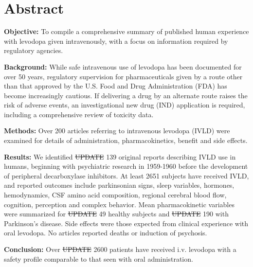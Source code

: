 \section{Abstract}
\textbf{Objective:} To compile a comprehensive summary of published human experience with levodopa given intravenously, with a focus on information required by regulatory agencies.

\textbf{Background:} While safe intravenous use of levodopa has been documented for over 50 years, regulatory supervision for pharmaceuticals given by a route other than that approved by the U.S. Food and Drug Administration (FDA) has become increasingly cautious. If delivering a drug by an alternate route raises the risk of adverse events, an investigational new drug (IND) application is required, including a comprehensive review of toxicity data.

\textbf{Methods:} Over 200 articles referring to intravenous levodopa (IVLD) were examined for details of administration, pharmacokinetics, benefit and side effects.

\textbf{Results:} We identified \sout{UPDATE} 139 original reports describing IVLD use in humans, beginning with psychiatric research in 1959-1960 before the development of peripheral decarboxylase inhibitors. At least 2651 subjects have received IVLD, and reported outcomes include parkinsonian signs, sleep variables, hormones, hemodynamics, CSF amino acid composition, regional cerebral blood ﬂow, cognition, perception and complex behavior. Mean pharmacokinetic variables were summarized for \sout{UPDATE} 49 healthy subjects and \sout{UPDATE} 190 with Parkinson's disease. Side effects were those expected from clinical experience with oral levodopa. No articles reported deaths or induction of psychosis.

\textbf{Conclusion:} Over \sout{UPDATE} 2600 patients have received i.v. levodopa with a safety profile comparable to that seen with oral administration.